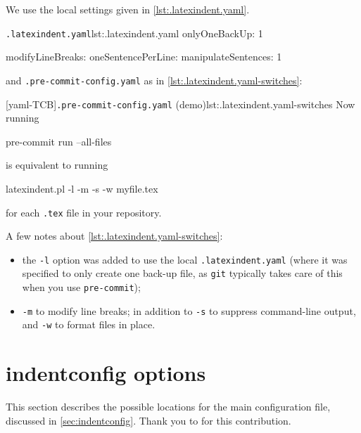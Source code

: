   \begin{example}
  We use the local settings given in \cref{lst:.latexindent.yaml}.
  \begin{cmhlistings}[style=tcblatex]{\texttt{.latexindent.yaml}}{lst:.latexindent.yaml}
onlyOneBackUp: 1

modifyLineBreaks:
 oneSentencePerLine:
   manipulateSentences: 1
\end{cmhlistings}

  and \texttt{.pre-commit-config.yaml} as in \cref{lst:.latexindent.yaml-switches}:

  [yaml-TCB]{\texttt{.pre-commit-config.yaml} (demo)}{lst:.latexindent.yaml-switches}
  Now running

  \begin{commandshell}
pre-commit run --all-files
\end{commandshell}

  is equivalent to running

  \begin{commandshell}
latexindent.pl -l -m -s -w myfile.tex
\end{commandshell}

  for each \texttt{.tex} file in your repository.

  A few notes about \cref{lst:.latexindent.yaml-switches}:
  \begin{itemize}
   \item the \texttt{-l} option was added to use the local \texttt{.latexindent.yaml}
         (where it was specified to only create one back-up file, as \texttt{git}
         typically takes care of this when you use \texttt{pre-commit});
   \item \texttt{-m} to modify line breaks; in addition to \texttt{-s} to suppress command-line
         output, and \texttt{-w} to format files in place.
  \end{itemize}
  \end{example}

 \section{indentconfig options}\label{app:indentconfig:options}
  This section describes the possible locations for the main configuration file,
  discussed in \cref{sec:indentconfig}. Thank you to \cite{nehctargl} for this
  contribution. 


